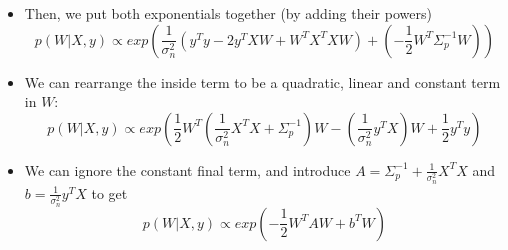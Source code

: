 \documentclass[12pt]{article}
\begin{document}
\begin{itemize}
     \item Then, we put both exponentials together (by adding their powers)
 \begin{equation}
     p(W|X,y) \propto exp\left(\frac{1}{\sigma^2_n}(y^Ty - 2y^TXW + W^TX^TXW) + \left(-\frac{1}{2}W^T\Sigma_p^{-1}W\right)\right)
 \end{equation}
     \item We can rearrange the inside term to be a quadratic, linear and constant term in $W$:
 \begin{equation}
     p(W|X,y) \propto exp\left(\frac{1}{2}W^T\left(\frac{1}{\sigma^2_n}X^TX + \Sigma_p^{-1}\right)W - \left(\frac{1}{\sigma^2_n}y^TX\right)W + \frac{1}{2}y^Ty\right)
 \end{equation}
     \item We can ignore the constant final term, and introduce $A = \Sigma_p^{-1} + \frac{1}{\sigma^2_n}X^TX$ and $b = \frac{1}{\sigma^2_n}y^TX$ to get
 \begin{equation}
     p(W|X,y) \propto exp\left(-\frac{1}{2}W^TAW + b^TW\right)
 \end{equation}
\end{itemize}
\end{document}
